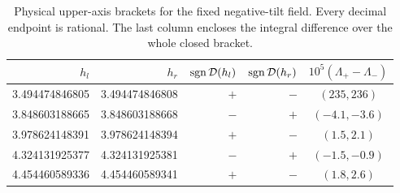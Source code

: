 \begin{table}[htbp]
\centering\small
\caption{Physical upper-axis brackets for the fixed negative-tilt field.
Every decimal endpoint is rational. The last column encloses the
integral difference over the whole closed bracket.}\label{tab:fixed-six}
\begin{tabular}{@{}rrrrc@{}}
\toprule
$h_l$ & $h_r$ & $\operatorname{sgn}\mathcal{D}(h_l)$ & $\operatorname{sgn}\mathcal{D}(h_r)$ & $10^5(\Lambda_+-\Lambda_-)$\\
\midrule
3.494474846805 & 3.494474846808 & $+$ & $-$ & $(235,236)$\\
3.848603188665 & 3.848603188668 & $-$ & $+$ & $(-4.1,-3.6)$\\
3.978624148391 & 3.978624148394 & $+$ & $-$ & $(1.5,2.1)$\\
4.324131925377 & 4.324131925381 & $-$ & $+$ & $(-1.5,-0.9)$\\
4.454460589336 & 4.454460589341 & $+$ & $-$ & $(1.8,2.6)$\\
\bottomrule
\end{tabular}
\end{table}
